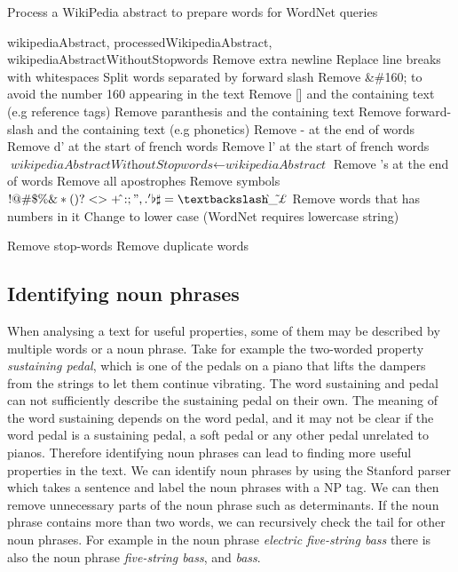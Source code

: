 \begin{algorithm}
	\caption{Process a WikiPedia abstract to prepare words for WordNet queries}\label{alg:processWikipediaAbstract}
	\begin{algorithmic}[1]
		\Require wikipediaAbstract,
		\Ensure processedWikipediaAbstract, wikipediaAbstractWithoutStopwords
		\State Remove extra newline
		\State Replace line breaks with whitespaces
		\State Split words separated by forward slash
		\State Remove \&\#160; to avoid the number 160 appearing in the text
		\State Remove [] and the containing text (e.g reference tags)
		\State Remove paranthesis and the containing text
		\State Remove forward-slash and the containing text (e.g phonetics)
		\State Remove - at the end of words
		\State Remove d' at the start of french words
		\State Remove l' at the start of french words
		\EndFor
		\State $\textit{wikipediaAbstractWithoutStopwords} \gets \textit{wikipediaAbstract}$
		\State Remove 's at the end of words
		\State Remove all apostrophes
		\State Remove symbols $!@\#\$\%\&*(){}?<>+\hat{}:;",.'\flat\sharp=\textbackslash\grave{}\_\tilde{}\pounds$\texteuro\textcurrency
		\State Remove words that has numbers in it
		\State Change to lower case (WordNet requires lowercase string)
		
		\State Remove stop-words
		\State Remove duplicate words
		\EndFor
		
		\State {}
		\EndProcedure
	\end{algorithmic}
\end{algorithm}


\subsection{Identifying noun phrases}
When analysing a text for useful properties, some of them may be described by multiple words or a noun phrase. Take for example the two-worded property \emph{sustaining pedal}, which is one of the pedals on a piano that lifts the dampers from the strings to let them continue vibrating. The word sustaining and pedal can not sufficiently describe the sustaining pedal on their own. The meaning of the word sustaining depends on the word pedal, and it may not be clear if the word pedal is a sustaining pedal, a soft pedal or any other pedal unrelated to pianos. Therefore identifying noun phrases can lead to finding more useful properties in the text. We can identify noun phrases by using the Stanford parser which takes a sentence and label the noun phrases with a NP tag. We can then remove unnecessary parts of the noun phrase such as determinants. If the noun phrase contains more than two words, we can recursively check the tail for other noun phrases. For example in the noun phrase \emph{electric five-string bass} there is also the noun phrase \emph{five-string bass}, and \emph{bass}.

